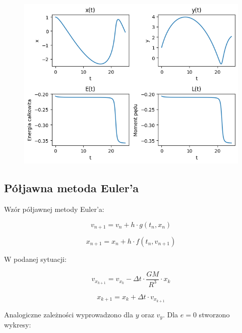 \documentclass{article}
\begin{document}
	\begin{figure}[h]
		\centering
		\includegraphics[scale = 0.70]{wykres4.png}
	\end{figure}

	\newpage

	\subsection*{Półjawna metoda Euler'a}

	Wzór półjawnej metody Euler'a:

	\begin{equation}
		v_{n+1} = v_n + h \cdot g(t_n, x_n)
	\end{equation}

	\begin{equation}
		x_{n+1} = x_n + h \cdot f(t_n, v_{n+1})
	\end{equation}

	W podanej sytuacji:

	\begin{equation}
		v_{x_{k+1}} = v_{x_k} - \Delta t \cdot \frac{GM}{R^3} \cdot x_k
	\end{equation}

	\begin{equation}
		x_{k+1} = x_k + \Delta t \cdot v_{x_{k+1}} 
	\end{equation}

	\newpage

	Analogiczne zależności wyprowadzono dla $y$ oraz $v_y$. Dla $e = 0$ stworzono wykresy:
\end{document}
